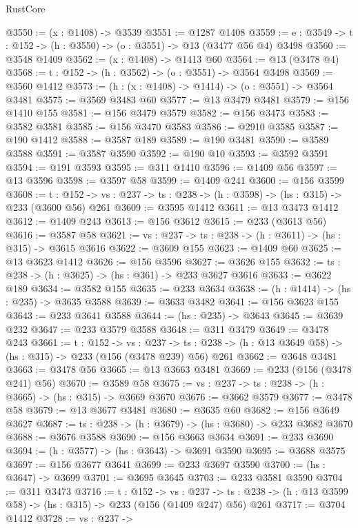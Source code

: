 \begin{lexlean}{RustCore}
\begin{coremodule}
@3550 := (x : @1408) -> @3539
@3551 := @1287 @1408
@3559 := {e : @3549} -> {t : @152} -> (h : @3550) -> (o : @3551) -> @13 (@3477 @56 @4) @3498
@3560 := @3548 @1409
@3562 := (x : @1408) -> @1413 @60
@3564 := @13 (@3478 @4)
@3568 := {t : @152} -> (h : @3562) -> (o : @3551) -> @3564 @3498
@3569 := @3560 @1412
@3573 := (h : (x : @1408) -> @1414) -> (o : @3551) -> @3564 @3481
@3575 := @3569 @3483 @60
@3577 := @13 @3479 @3481
@3579 := @156 @1410 @155
@3581 := @156 @3479 @3579
@3582 := @156 @3473
@3583 := @3582 @3581
@3585 := @156 @3470 @3583
@3586 := @2910 @3585
@3587 := @190 @1412
@3588 := @3587 @189
@3589 := @190 @3481
@3590 := @3589 @3588
@3591 := @3587 @3590
@3592 := @190 @10
@3593 := @3592 @3591
@3594 := @191 @3593
@3595 := @311 @1410
@3596 := @1409 @56
@3597 := @13 @3596
@3598 := @3597 @58
@3599 := @1409 @241
@3600 := @156 @3599
@3608 := {t : @152} ->
  {vs : @237} -> {ts : @238} -> (h : @3598) -> (hs : @315) -> @233 (@3600 @56) @261
@3609 := @3595 @1412
@3611 := @13 @3473 @1412
@3612 := @1409 @243
@3613 := @156 @3612
@3615 := @233 (@3613 @56)
@3616 := @3587 @58
@3621 := {vs : @237} -> {ts : @238} -> (h : @3611) -> (hs : @315) -> @3615 @3616
@3622 := @3609 @155
@3623 := @1409 @60
@3625 := @13 @3623 @1412
@3626 := @156 @3596
@3627 := @3626 @155
@3632 := {ts : @238} -> (h : @3625) -> (hs : @361) -> @233 @3627 @3616
@3633 := @3622 @189
@3634 := @3582 @155
@3635 := @233 @3634
@3638 := (h : @1414) -> (hs : @235) -> @3635 @3588
@3639 := @3633 @3482
@3641 := @156 @3623 @155
@3643 := @233 @3641 @3588
@3644 := (hs : @235) -> @3643
@3645 := @3639 @232
@3647 := @233 @3579 @3588
@3648 := @311 @3479
@3649 := @3478 @243
@3661 := {t : @152} ->
  {vs : @237} ->
  {ts : @238} -> (h : @13 @3649 @58) -> (hs : @315) -> @233 (@156 (@3478 @239) @56) @261
@3662 := @3648 @3481
@3663 := @3478 @56
@3665 := @13 @3663 @3481
@3669 := @233 (@156 (@3478 @241) @56)
@3670 := @3589 @58
@3675 := {vs : @237} -> {ts : @238} -> (h : @3665) -> (hs : @315) -> @3669 @3670
@3676 := @3662 @3579
@3677 := @3478 @58
@3679 := @13 @3677 @3481
@3680 := @3635 @60
@3682 := @156 @3649 @3627
@3687 := {ts : @238} -> (h : @3679) -> (hs : @3680) -> @233 @3682 @3670
@3688 := @3676 @3588
@3690 := @156 @3663 @3634
@3691 := @233 @3690
@3694 := (h : @3577) -> (hs : @3643) -> @3691 @3590
@3695 := @3688 @3575
@3697 := @156 @3677 @3641
@3699 := @233 @3697 @3590
@3700 := (hs : @3647) -> @3699
@3701 := @3695 @3645
@3703 := @233 @3581 @3590
@3704 := @311 @3473
@3716 := {t : @152} ->
  {vs : @237} ->
  {ts : @238} -> (h : @13 @3599 @58) -> (hs : @315) -> @233 (@156 (@1409 @247) @56) @261
@3717 := @3704 @1412
@3728 := {vs : @237} ->

\end{coremodule}
\end{lexlean}
